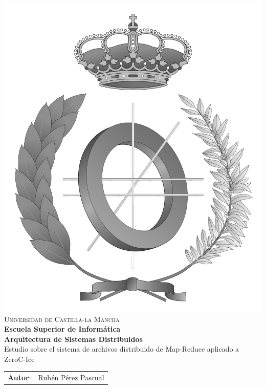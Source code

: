\documentclass[a4paper,spanish,11pt]{article}
\begin{document}
\renewcommand*{\thepage}{\roman{page}}

\begin{titlepage}
  \begin{center}
    \includegraphics[width=.4\textwidth]{logos/emblema_informatica-gray.pdf} \\
    \vspace*{0,5cm} {\Large \textsc{Universidad de Castilla-la Mancha\\}}
    \vspace{3mm}
    {\Large \textbf{Escuela Superior de Informática}}  \\
    \vspace{1,7cm}
    {\huge \textbf{Arquitectura de Sistemas Distribuidos}} \\
    \vspace{1,7cm}
    \Large{Estudio sobre el sistema de archivos distribuido de Map-Reduce aplicado a ZeroC-Ice}
    
    \vspace{0.1cm}
    
  \end{center}
  \vspace{4cm}
  \begin{table}[!h]
    \Large
    \begin{tabular}{rl}
      \textbf{Autor}: & Rubén Pérez Pascual \\
      
    \end{tabular}
  \end{table}
\end{titlepage}




\newpage
\thispagestyle{empty}
\tableofcontents
\newpage
\end{document}
